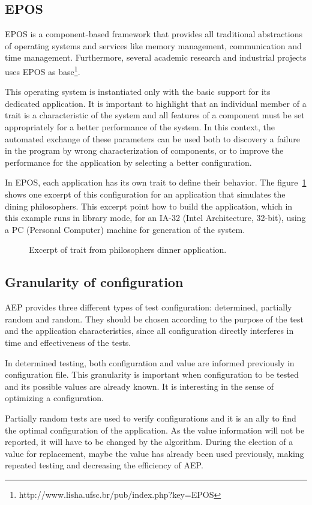 \documentclass[conference]{IEEEtran}
\newcommand{\progcpp}[3][tbp]{
 \begin{figure}[#1]
     
   \caption{#3\label{progcpp:#2}}
 \end{figure}
}
\begin{document}
\subsection{EPOS}
EPOS is a component-based framework that provides all traditional abstractions of operating systems and services like memory management, communication and time management. Furthermore,  several academic research and industrial projects uses EPOS as base\footnote{http://www.lisha.ufsc.br/pub/index.php?key=EPOS}.

This operating system is instantiated only with the basic support for its dedicated application. It is important to highlight that an individual member of a trait is a characteristic of the system and all features of a component must be set appropriately for a better performance of the system. In this context, the automated exchange of these parameters can be used both to discovery a failure in the program by wrong characterization of components, or to improve the performance for the application by selecting a better configuration.

In EPOS, each application has its own trait to define their behavior. The figure~\ref{progcpp:trait_build} shows one excerpt of this configuration for an application that simulates the dining philosophers. This excerpt point how to build the application, which in this example runs in library mode, for an IA-32 (Intel Architecture, 32-bit), using a PC (Personal Computer) machine for generation of the system.
\progcpp{trait_build}{Excerpt of trait from philosophers dinner application.}

\subsection{Granularity of configuration}
AEP provides three different types of test configuration: determined, partially random and random. They should be chosen according to the purpose of the test and the application characteristics, since all configuration directly interferes in time and effectiveness of the tests.

In determined testing, both configuration and value are informed previously in configuration file. This granularity is important when  configuration to be tested and its possible values are already known. It is interesting in the sense of optimizing a configuration.

Partially random tests are used to verify configurations and it is an ally to find the optimal configuration of the application. As the value information will not be reported, it will have to be changed by the algorithm. During the election of a value for replacement, maybe the value has already been used previously, making repeated testing and decreasing the efficiency of AEP.
\end{document}
